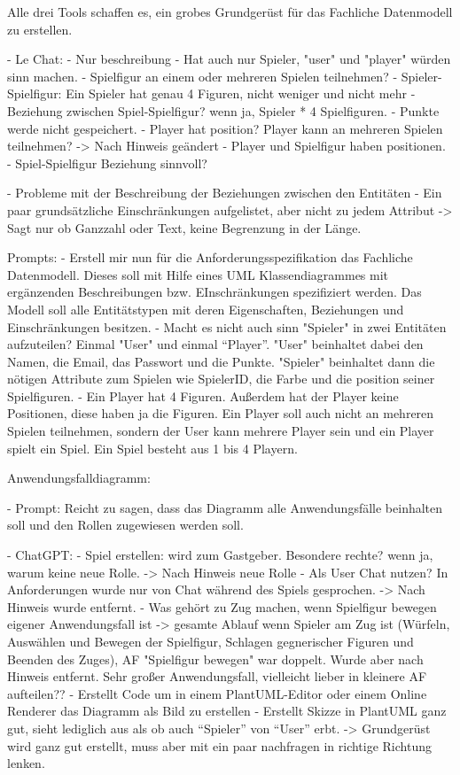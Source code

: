 Alle drei Tools schaffen es, ein grobes Grundgerüst für das Fachliche Datenmodell zu erstellen.


- Le Chat:
    - Nur beschreibung
    - Hat auch nur Spieler, "user" und "player" würden sinn machen.
    - Spielfigur an einem oder mehreren Spielen teilnehmen?
    - Spieler-Spielfigur: Ein Spieler hat genau 4 Figuren, nicht weniger und nicht mehr
    - Beziehung zwischen Spiel-Spielfigur? wenn ja, Spieler * 4 Spielfiguren.
    - Punkte werde nicht gespeichert.
    - Player hat position? Player kann an mehreren Spielen teilnehmen? -> Nach Hinweis geändert
    - Player und Spielfigur haben positionen.
    - Spiel-Spielfigur Beziehung sinnvoll?

    - Probleme mit der Beschreibung der Beziehungen zwischen den Entitäten
    - Ein paar grundsätzliche Einschränkungen aufgelistet, aber nicht zu jedem Attribut -> Sagt nur ob Ganzzahl oder Text,
    keine Begrenzung in der Länge.

    Prompts:
        - Erstell mir nun für die Anforderungsspezifikation das Fachliche Datenmodell. Dieses soll mit Hilfe eines UML Klassendiagrammes mit ergänzenden Beschreibungen bzw. EInschränkungen spezifiziert werden. Das Modell soll alle Entitätstypen mit deren Eigenschaften, Beziehungen und Einschränkungen besitzen.
        - Macht es nicht auch sinn "Spieler" in zwei Entitäten aufzuteilen? Einmal "User" und einmal ``Player''.  "User" beinhaltet dabei den Namen, die Email, das Passwort und die Punkte. "Spieler" beinhaltet dann die nötigen Attribute zum Spielen wie SpielerID, die Farbe und die position seiner Spielfiguren.
        - Ein Player hat 4 Figuren. Außerdem hat der Player keine Positionen, diese haben ja die Figuren. Ein Player soll auch nicht an mehreren Spielen teilnehmen, sondern der User kann mehrere Player sein und ein Player spielt ein Spiel. Ein Spiel besteht aus 1 bis 4 Playern.


Anwendungsfalldiagramm:

- Prompt: Reicht zu sagen, dass das Diagramm alle Anwendungsfälle beinhalten soll und den Rollen zugewiesen werden soll.

- ChatGPT:
    - Spiel erstellen: wird zum Gastgeber. Besondere rechte? wenn ja, warum keine neue Rolle. -> Nach Hinweis neue Rolle
    - Als User Chat nutzen? In Anforderungen wurde nur von Chat während des Spiels gesprochen. -> Nach Hinweis wurde entfernt.
    - Was gehört zu Zug machen, wenn Spielfigur bewegen eigener Anwendungsfall ist -> gesamte Ablauf wenn Spieler am Zug ist
    (Würfeln, Auswählen und Bewegen der Spielfigur, Schlagen gegnerischer Figuren und Beenden des Zuges), AF "Spielfigur bewegen" 
    war doppelt. Wurde aber nach Hinweis entfernt. Sehr großer Anwendungsfall, vielleicht lieber in kleinere AF aufteilen??
    - Erstellt Code um in einem PlantUML-Editor oder einem Online Renderer das Diagramm als Bild zu erstellen
    - Erstellt Skizze in PlantUML ganz gut, sieht lediglich aus als ob auch ``Spieler'' von ``User'' erbt.
    -> Grundgerüst wird ganz gut erstellt, muss aber mit ein paar nachfragen in richtige Richtung lenken.

